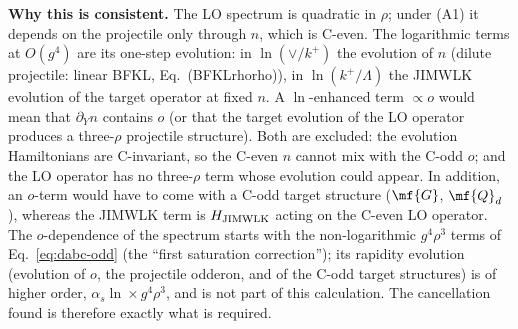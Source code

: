 \noindent\textbf{Why this is consistent.} The LO spectrum is quadratic in $\rho$; under (A1) it depends on the projectile only through $n$, which is C-even. The logarithmic terms at $O(g^{4})$ are its one-step evolution: in $\ln(\vee/k^{+})$ the evolution of $n$ (dilute projectile: linear BFKL, Eq.~(BFKLrhorho)), in $\ln(k^{+}/\Lambda)$ the JIMWLK evolution of the target operator at fixed $n$. A $\ln$-enhanced term $\propto o$ would mean that $\partial_{Y}n$ contains $o$ (or that the target evolution of the LO operator produces a three-$\rho$ projectile structure). Both are excluded: the evolution Hamiltonians are C-invariant, so the C-even $n$ cannot mix with the C-odd $o$; and the LO operator has no three-$\rho$ term whose evolution could appear. In addition, an $o$-term would have to come with a C-odd target structure ($\mf{G}$, $\mf{Q}_{d}$), whereas the JIMWLK term is $H_{\rm JIMWLK}$ acting on the C-even LO operator. The $o$-dependence of the spectrum starts with the non-logarithmic $g^{4}\rho^{3}$ terms of Eq.~\eqref{eq:dabc-odd} (the ``first saturation correction''); its rapidity evolution (evolution of $o$, the projectile odderon, and of the C-odd target structures) is of higher order, $\alpha_{s}\ln\times g^{4}\rho^{3}$, and is not part of this calculation. The cancellation found is therefore exactly what is required.

